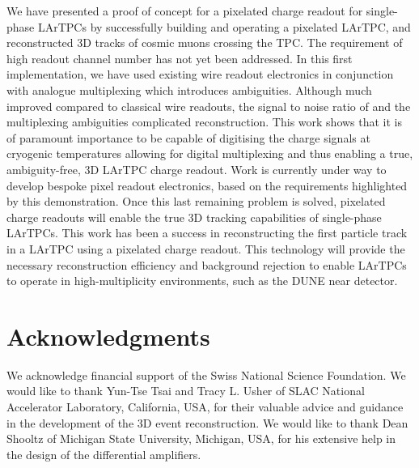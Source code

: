 \documentclass[a4paper]{article}
\begin{document}
We have presented a proof of concept for a pixelated charge readout for single-phase LArTPCs by successfully building and operating a pixelated LArTPC, and reconstructed 3D tracks of cosmic muons crossing the TPC.
The requirement of high readout channel number has not yet been addressed.
In this first implementation, we have used existing wire readout electronics in conjunction with analogue multiplexing which introduces ambiguities.
Although much improved compared to classical wire readouts, the signal to noise ratio of and the multiplexing ambiguities complicated reconstruction.
This work shows that it is of paramount importance to be capable of digitising the charge signals at cryogenic temperatures allowing for digital multiplexing and thus enabling a true, ambiguity-free, 3D LArTPC charge readout.
Work is currently under way to develop bespoke pixel readout electronics, based on the requirements highlighted by this demonstration. 
Once this last remaining problem is solved, pixelated charge readouts will enable the true 3D tracking capabilities of single-phase LArTPCs.
This work has been a success in reconstructing the first particle track in a LArTPC using a pixelated charge readout.   
This technology will provide the necessary reconstruction efficiency and background rejection to enable LArTPCs to operate in high-multiplicity environments, such as the DUNE near detector.


\section*{Acknowledgments}We acknowledge financial support of the Swiss National Science Foundation.
We would like to thank Yun-Tse Tsai and Tracy L. Usher of SLAC National Accelerator Laboratory, California, USA, for their valuable advice and guidance in the development of the 3D event reconstruction. 
We would like to thank Dean Shooltz of Michigan State University, Michigan, USA, for his extensive help in the design of the differential amplifiers.

\printbibliography
\end{document}
